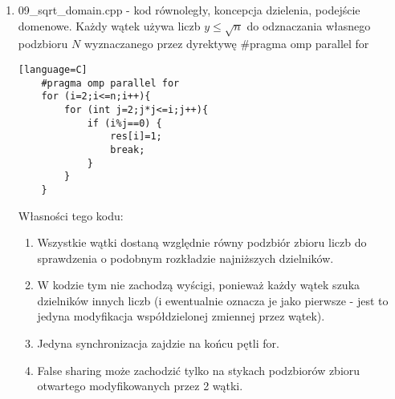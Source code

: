 \documentclass[12pt]{article}
\begin{document}
\begin {enumerate}
\begin{lstlisting}[style=mystyle, caption= Sito funkcyjne z dynamic schedulingiem][language=C]
		for (i=2;i<=n;i++){
			for (j=v1;j*j<=i && j<=v2;j++){
				if (i%j==0) {
				res[i]=1;
				break;
			}
		}
	}
	\end{lstlisting}
	Własności tego kodu:
	\begin{enumerate}
		\item Wszystkie wątki dostaną względnie równy zbiór liczb pierwszych do sprawdzenia - to wynika ze sposobu wyznaczenia lewego i prawego końca przedziału
		\item W kodzie tym nie zachodzą wyścigi, bo wyznaczanie dzielnika w 1 wątku i ewentualne oznaczenie liczby jako złożona jest niezależne od działania innych wątków.
		\item Jedyna synchronizacja zajdzie na końcu pętli for.
		\item False sharing może zajść dla całej tablicy liczb pierwszych, ponieważ wątki ją modyfikują niezależnie od siebie.
	\end{enumerate}
	Fundamentalnym problemem algorytmu jest nonsensowny algorytm - każda liczba jest dzielona przez liczby do pierwiastka z niej niezależnie od tego, czy znalazłem jej dzielnik w innym wątku. To zapewnia mniejszy narzut związany z synchronizacją, jednocześnie generując problemy związane z nieefektywnością.
	
	\item 09\_sqrt\_domain.cpp - kod równoległy, koncepcja dzielenia, podejście domenowe. Każdy wątek używa liczb \(y\le\sqrt{n}\) do odznaczania własnego podzbioru \(N\) wyznaczanego przez dyrektywę \#pragma omp parallel for
	\begin{lstlisting}[style=mystyle, caption= Sito funkcyjne z dynamic schedulingiem][language=C]
	#pragma omp parallel for
	for (i=2;i<=n;i++){
		for (int j=2;j*j<=i;j++){
			if (i%j==0) {
				res[i]=1;
				break;
			}
		}
	}
	\end{lstlisting}
	Własności tego kodu:
	\begin{enumerate}
		\item Wszystkie wątki dostaną względnie równy podzbiór zbioru liczb do sprawdzenia o podobnym rozkładzie najniższych dzielników.
		\item W kodzie tym nie zachodzą wyścigi, ponieważ każdy wątek szuka dzielników innych liczb (i ewentualnie oznacza je jako pierwsze - jest to jedyna modyfikacja współdzielonej zmiennej przez wątek).
		\item Jedyna synchronizacja zajdzie na końcu pętli for.
		\item False sharing może zachodzić tylko na stykach podzbiorów zbioru otwartego modyfikowanych przez 2 wątki.
	\end{enumerate}

	
\end {enumerate}
\end{document}
